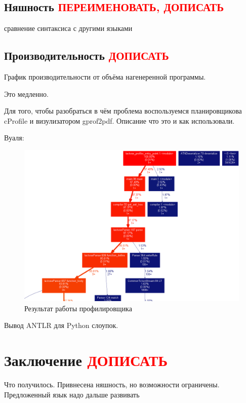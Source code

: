 \documentclass[12pt,a4paper,oneside]{extarticle}
\begin{document}
    \subsection{Няшность  \textcolor{red}{ПЕРЕИМЕНОВАТЬ, ДОПИСАТЬ}}

        сравнение синтаксиса с другими языками

    \subsection{Производительность \textcolor{red}{ДОПИСАТЬ}}

        График производительности от объёма нагенеренной программы.

        Это медленно.

        Для того, чтобы разобраться в чём проблема воспользуемся планировщикова cProfile и визулизатором gprof2pdf. 
        Описание что это и как использовали.

        Вуаля:

        \begin{figure}[h!]
            \center
            \includegraphics[scale=0.3]{lactose_stats.png}
            \caption{Результат работы профилировщика}
            \label{pic:stats}
        \end{figure}

        Вывод ANTLR для Python слоупок.
    
\clearpage

\section{Заключение \textcolor{red}{ДОПИСАТЬ}}
    Что получилось. Привнесена няшность, но возможности ограничены. Предложенный язык надо дальше развивать
\end{document}
